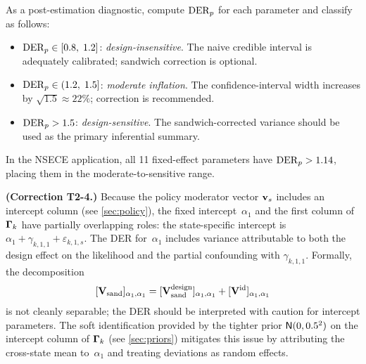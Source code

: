 \begin{proposition}
\label{smc:prop-der-diagnostic}
  As a post-estimation diagnostic, compute $\operatorname{DER}_p$ for each
  parameter and classify as follows\textup{:}
  \begin{itemize}[nosep]
    \item $\operatorname{DER}_p \in [0.8,\;1.2]$\textup{:}
      \emph{design-insensitive}.  The naive credible interval is
      adequately calibrated; sandwich correction is optional.
    \item $\operatorname{DER}_p \in (1.2,\;1.5]$\textup{:}
      \emph{moderate inflation}.  The confidence-interval width
      increases by $\sqrt{1.5} \approx 22\%$; correction is
      recommended.
    \item $\operatorname{DER}_p > 1.5$\textup{:}
      \emph{design-sensitive}.  The sandwich-corrected variance should
      be used as the primary inferential summary.
  \end{itemize}
  In the NSECE application, all 11 fixed-effect parameters have
  $\operatorname{DER}_p > 1.14$, placing them in the moderate-to-sensitive range.
\end{proposition}


\begin{remark}
\label{smc:rem-intercept-id}
  {\upshape\textbf{(Correction T2-4.)}}
  Because the policy moderator vector $\mathbf{v}_s$ includes an intercept
  column (see \cref{sec:policy}), the fixed
  intercept~$\alpha_1$ and the first column of $\boldsymbol{\Gamma}_k$ have
  partially overlapping roles: the state-specific intercept is
  $\alpha_1 + \gamma_{k,1,1} + \varepsilon_{k,1,s}$.  The DER
  for~$\alpha_1$ includes variance attributable to both the design
  effect on the likelihood and the partial confounding with
  $\gamma_{k,1,1}$.  Formally, the decomposition
  \begin{equation}\label{smc:eq-intercept-decomp}
    [\mathbf{V}_{\mathrm{sand}}]_{\alpha_1,\alpha_1}
    = [\mathbf{V}_{\mathrm{sand}}^{\textup{design}}]_{\alpha_1,\alpha_1}
    + [\mathbf{V}^{\textup{id}}]_{\alpha_1,\alpha_1}
  \end{equation}
  is not cleanly separable; the DER should be interpreted with caution
  for intercept parameters.  The soft identification provided by the
  tighter prior $\textsf{N}(0, 0.5^2)$ on the intercept column of
  $\boldsymbol{\Gamma}_k$ (see \cref{sec:priors}) mitigates this issue by
  attributing the cross-state mean to~$\alpha_1$ and treating
  deviations as random effects.
\end{remark}

